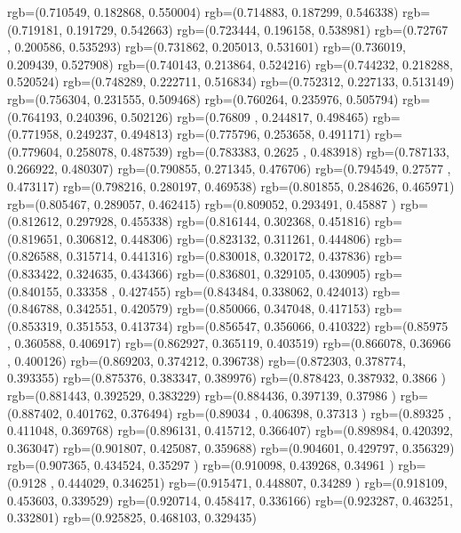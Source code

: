 {{{		  rgb=(0.710549,  0.182868,  0.550004)
		  rgb=(0.714883,  0.187299,  0.546338)
		  rgb=(0.719181,  0.191729,  0.542663)
		  rgb=(0.723444,  0.196158,  0.538981)
		  rgb=(0.72767 ,  0.200586,  0.535293)
		  rgb=(0.731862,  0.205013,  0.531601)
		  rgb=(0.736019,  0.209439,  0.527908)
		  rgb=(0.740143,  0.213864,  0.524216)
		  rgb=(0.744232,  0.218288,  0.520524)
		  rgb=(0.748289,  0.222711,  0.516834)
		  rgb=(0.752312,  0.227133,  0.513149)
		  rgb=(0.756304,  0.231555,  0.509468)
		  rgb=(0.760264,  0.235976,  0.505794)
		  rgb=(0.764193,  0.240396,  0.502126)
		  rgb=(0.76809 ,  0.244817,  0.498465)
		  rgb=(0.771958,  0.249237,  0.494813)
		  rgb=(0.775796,  0.253658,  0.491171)
		  rgb=(0.779604,  0.258078,  0.487539)
		  rgb=(0.783383,  0.2625  ,  0.483918)
		  rgb=(0.787133,  0.266922,  0.480307)
		  rgb=(0.790855,  0.271345,  0.476706)
		  rgb=(0.794549,  0.27577 ,  0.473117)
		  rgb=(0.798216,  0.280197,  0.469538)
		  rgb=(0.801855,  0.284626,  0.465971)
		  rgb=(0.805467,  0.289057,  0.462415)
		  rgb=(0.809052,  0.293491,  0.45887 )
		  rgb=(0.812612,  0.297928,  0.455338)
		  rgb=(0.816144,  0.302368,  0.451816)
		  rgb=(0.819651,  0.306812,  0.448306)
		  rgb=(0.823132,  0.311261,  0.444806)
		  rgb=(0.826588,  0.315714,  0.441316)
		  rgb=(0.830018,  0.320172,  0.437836)
		  rgb=(0.833422,  0.324635,  0.434366)
		  rgb=(0.836801,  0.329105,  0.430905)
		  rgb=(0.840155,  0.33358 ,  0.427455)
		  rgb=(0.843484,  0.338062,  0.424013)
		  rgb=(0.846788,  0.342551,  0.420579)
		  rgb=(0.850066,  0.347048,  0.417153)
		  rgb=(0.853319,  0.351553,  0.413734)
		  rgb=(0.856547,  0.356066,  0.410322)
		  rgb=(0.85975 ,  0.360588,  0.406917)
		  rgb=(0.862927,  0.365119,  0.403519)
		  rgb=(0.866078,  0.36966 ,  0.400126)
		  rgb=(0.869203,  0.374212,  0.396738)
		  rgb=(0.872303,  0.378774,  0.393355)
		  rgb=(0.875376,  0.383347,  0.389976)
		  rgb=(0.878423,  0.387932,  0.3866  )
		  rgb=(0.881443,  0.392529,  0.383229)
		  rgb=(0.884436,  0.397139,  0.37986 )
		  rgb=(0.887402,  0.401762,  0.376494)
		  rgb=(0.89034 ,  0.406398,  0.37313 )
		  rgb=(0.89325 ,  0.411048,  0.369768)
		  rgb=(0.896131,  0.415712,  0.366407)
		  rgb=(0.898984,  0.420392,  0.363047)
		  rgb=(0.901807,  0.425087,  0.359688)
		  rgb=(0.904601,  0.429797,  0.356329)
		  rgb=(0.907365,  0.434524,  0.35297 )
		  rgb=(0.910098,  0.439268,  0.34961 )
		  rgb=(0.9128  ,  0.444029,  0.346251)
		  rgb=(0.915471,  0.448807,  0.34289 )
		  rgb=(0.918109,  0.453603,  0.339529)
		  rgb=(0.920714,  0.458417,  0.336166)
		  rgb=(0.923287,  0.463251,  0.332801)
		  rgb=(0.925825,  0.468103,  0.329435)
}}}
